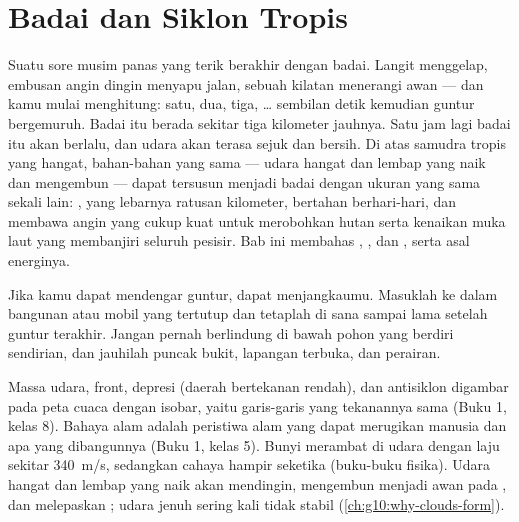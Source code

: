 \chapter{Badai dan Siklon Tropis}\label{ch:g10:storms-and-cyclones}

Suatu sore musim panas yang terik berakhir dengan badai. Langit menggelap,
embusan angin dingin menyapu jalan, sebuah kilatan menerangi awan --- dan kamu
mulai menghitung: satu, dua, tiga, \ldots{} sembilan detik kemudian guntur
bergemuruh. Badai itu berada sekitar tiga kilometer jauhnya. Satu jam lagi
badai itu akan berlalu, dan udara akan terasa sejuk dan bersih. Di atas
samudra tropis yang hangat, bahan-bahan yang sama --- udara hangat dan lembap
yang naik dan mengembun --- dapat tersusun menjadi badai dengan ukuran yang
sama sekali lain: , yang lebarnya ratusan kilometer, bertahan
berhari-hari, dan membawa angin yang cukup kuat untuk merobohkan hutan serta
kenaikan muka laut yang membanjiri seluruh pesisir. Bab ini membahas , , dan , serta asal energinya.

\begin{safety}
Jika kamu dapat mendengar guntur,  dapat menjangkaumu. Masuklah ke dalam
bangunan atau mobil yang tertutup dan tetaplah di sana sampai lama setelah
guntur terakhir. Jangan pernah berlindung di bawah pohon yang berdiri
sendirian, dan jauhilah puncak bukit, lapangan terbuka, dan perairan.
\end{safety}

\begin{recall}
Massa udara, front, depresi (daerah bertekanan rendah), dan antisiklon
digambar pada peta cuaca dengan isobar, yaitu garis-garis yang tekanannya sama
(Buku 1, kelas 8). Bahaya alam adalah peristiwa alam yang dapat merugikan
manusia dan apa yang dibangunnya (Buku 1, kelas 5). Bunyi merambat di udara
dengan laju sekitar \qty{340}{m/s}, sedangkan cahaya hampir seketika
(buku-buku fisika). Udara hangat dan lembap yang naik akan mendingin,
mengembun menjadi awan pada , dan melepaskan ;
udara jenuh sering kali tidak stabil (\cref{ch:g10:why-clouds-form}).
\end{recall}

